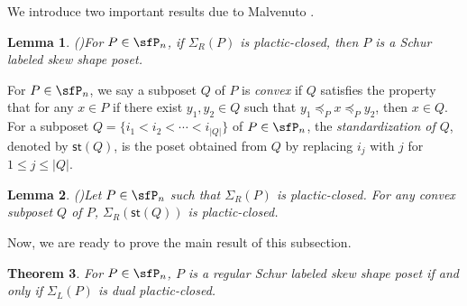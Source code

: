 \documentclass[12pt, reqno]{amsart}
\newtheorem{theorem}{Theorem}[section]
\newtheorem{lemma}[theorem]{Lemma}
\theoremstyle{definition}
\numberwithin{equation}{section} \numberwithin{figure}{section}
\numberwithin{table}{section}
\begin{document}
We introduce two important results due to Malvenuto \cite{93M}.

\begin{lemma}{\rm(\cite[Theorem 1]{93M})}\label{lem: thm of Mal}
For $P \in \sfP_n$, if $\Sigma_R(P)$ is plactic-closed, then $P$ is a Schur labeled skew shape poset.
\end{lemma}


For $P \in \sfP_n$, we say a subposet $Q$ of $P$ is \emph{convex} if $Q$ satisfies the property that for any $x \in P$ if there exist $y_1, y_2 \in Q$ such that $y_1 \preceq_P x \preceq_P y_2$, then $x \in Q$.
For a subposet $Q = \{i_1 < i_2 < \cdots <i_{|Q|} \}$ of $P \in \sfP_n$, the \emph{standardization of $Q$}, denoted by $\mathsf{st}(Q)$, is the poset obtained from $Q$ by replacing $i_j$ with $j$ for $1 \leq j \leq |Q|$.


\begin{lemma}{\rm(\cite[Corollary 1]{93M})}\label{lem: cor of Mal}
Let $P \in \sfP_n$ such that $\Sigma_R(P)$ is plactic-closed.
For any convex subposet $Q$ of $P$, $\Sigma_R(\mathsf{st}(Q))$ is plactic-closed.
\end{lemma}





Now, we are ready to prove the main result of this subsection.



\begin{theorem}\label{thm: RSP iff DPC}
For $P \in \sfP_n$, $P$ is a regular Schur labeled skew shape poset if and only if $\Sigma_L(P)$ is dual plactic-closed.
\end{theorem}
\end{document}
